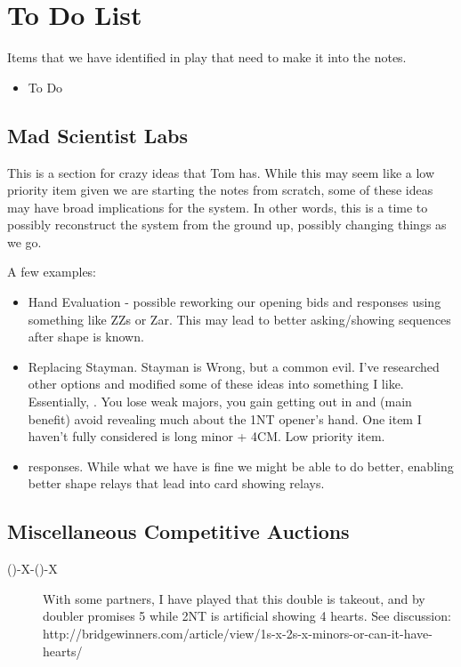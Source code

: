 \documentclass[tom-ari]{subfile}
\begin{document}
	
	\chapter{To Do List}
	
	Items that we have identified in play that need to make it into the notes.
	\begin{itemize}
		\item To Do
	\end{itemize}

	\section{Mad Scientist Labs}
	
	This is a section for crazy ideas that Tom has.  While this may seem like a low priority item given we are starting the notes from scratch, some of these ideas may have broad implications for the system.  In other words, this is a time to possibly reconstruct the system from the ground up, possibly changing things as we go.
	
	A few examples:
	
	\begin{itemize}
		\item Hand Evaluation - possible reworking our opening bids and responses using something like ZZs or Zar.  This may lead to better asking/showing sequences after shape is known.
		\item Replacing Stayman.  Stayman is Wrong, but a common evil.  I've researched other options and modified some of these ideas into something I like.  Essentially, \rightarrow{}.  You lose weak majors, you gain getting out in  and (main benefit) avoid revealing much about the 1NT opener's hand.  One item I haven't fully considered is long minor + 4CM.  Low priority item.
		\item {} responses.  While what we have is fine we might be able to do better, enabling better shape relays that lead into card showing relays.
	\end{itemize}

         \section{Miscellaneous Competitive Auctions}

         \begin{description}
             \item[()-X-()-X] With some partners, I have played that this double is takeout, and  by doubler promises 5 \heartsuit while 2NT is artificial showing 4 hearts. See discussion: http://bridgewinners.com/article/view/1s-x-2s-x-minors-or-can-it-have-hearts/              
         \end{description}
	
\end{document}
